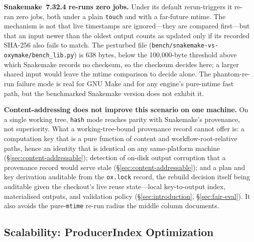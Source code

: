 \documentclass[12pt,a4paper]{article}
\newcommand{\code}[1]{{\texttt{\small\color{inlinecode}#1}}}
\begin{document}
\textbf{Snakemake~7.32.4 re-runs zero jobs.} Under its default
rerun-triggers it re-ran zero jobs, both under a plain \code{touch} and
with a far-future mtime. The mechanism is not that live
timestamps are ignored---they are compared first---but that an input
newer than the oldest output counts as updated only if its recorded
SHA-256 also fails to match. The perturbed file
(\code{bench/snakemake-vs-oxymake/bench\_lib.py}) is 638 bytes, below the
100{,}000-byte threshold above which Snakemake records no checksum, so
the checksum decides here; a larger shared input would leave the mtime
comparison to decide alone. The phantom-re-run failure mode is real
for GNU Make and for any engine's pure-mtime fast path, but the
benchmarked Snakemake version does not exhibit it.

\textbf{Content-addressing does not improve this scenario on one
machine.} On a single working tree, \code{hash} mode reaches parity
with Snakemake's provenance, not superiority. What a
working-tree-bound provenance record cannot offer is: a
computation key that is a pure function of content and workflow-root-relative
paths, hence an identity that is identical on any same-platform
machine (\S\ref{sec:content-addressable}); detection
of on-disk output corruption that a provenance record would serve
stale (\S\ref{sec:content-addressable}); and a plan and key derivation
auditable from the \code{ox.lock} record, the rebuild decision itself
being auditable given the checkout's live reuse state---local
key-to-output index, materialised outputs, and validation policy
(\S\ref{sec:introduction}, \S\ref{sec:fair-eval}).
It also avoids the pure-\code{mtime} re-run radius the
middle column documents.

\subsection{Scalability: ProducerIndex Optimization}
\label{sec:scale-study}
\end{document}
